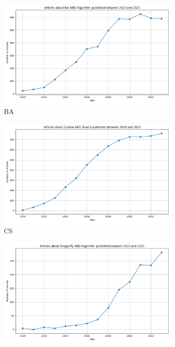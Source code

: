 \begin{figure}[htp]
  \centering
  \begin{subfigure}[b]{0.45\textwidth}
    \includegraphics[width=\textwidth]{imagenes/scopus_chart_Bat_Algorithm.png}
    \caption{BA}
    \label{fig:bat_algorithm}
  \end{subfigure}
  \begin{subfigure}[b]{0.45\textwidth}
    \includegraphics[width=\textwidth]{imagenes/scopus_chart_Cuckoo_Search.png}
    \caption{CS}
    \label{fig:cuckoo_search}
  \end{subfigure}
  \begin{subfigure}[b]{0.45\textwidth}
    \includegraphics[width=\textwidth]{imagenes/scopus_chart_Dragonfly_Algorithm.png}

\end{subfigure}
\end{figure}
